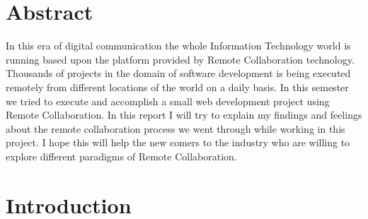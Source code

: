\chapter{Abstract} 
In this era of digital communication the whole Information Technology world is running based upon the platform provided by Remote Collaboration technology. Thousands of projects in the domain of software development is being executed remotely from different locations of the world on a daily basis. In this semester we tried to execute and accomplish a small web development project using Remote Collaboration. In this report I will try to explain my findings and feelings about the remote collaboration process we went through while working in this project. I hope this will help the new comers to the industry who are willing to explore different paradigms of Remote Collaboration. 

\chapter{Introduction } %

\label{ChapterX} %

